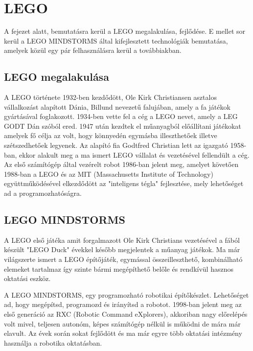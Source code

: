 \chapter{LEGO} \label{ch:ROBOT}

\begin{osszefoglal}
	A fejezet alatt, bemutatásra kerül a LEGO megalakulása, fejlődése. E mellet sor kerül a LEGO MINDSTORMS által kifejlesztett technológiák bemutatása, amelyek közül egy pár felhasználásra kerül a továbbiakban.
\end{osszefoglal}

\section{LEGO megalakulása}\label{sec:ROBOT:lego}
A LEGO története 1932-ben kezdődött,  Ole Kirk Christiansen asztalos vállalkozást alapított Dánia, Billund nevezetű falujában, amely a fa játékok gyártásával foglakozott. 1934-ben vette fel a cég a LEGO nevet, amely a LEG GODT Dán szóból ered. 1947 után kezdtek el műanyagból előállítani játékokat amelyek fő célja az volt, hogy könnyedén egymásba illeszthetőek illetve szétszedhetőek legyenek. Az alapító fia Godtfred Christian lett az igazgató 1958-ban, ekkor alakult meg a ma ismert LEGO vállalat és vezetésével fellendült a cég. Az első számítógép által vezérelt robot 1986-ban jelent meg, amelyet követően 1988-ban a LEGO és az MIT (Massachusetts Institute of Technology) együttműködésével elkezdődött az "inteligens tégla" fejlesztése, mely lehetőséget ad a programozhatóságra.

\section{LEGO MINDSTORMS}\label{sec:ROBOT:mindstorms}
A LEGO első játéka amit forgalmazott Ole Kirk Christians vezetésével a fából készült "LEGO Duck" évekkel később megjelentek a műanyag játékok. Ma már világszerte ismert a LEGO építőjáték, egymással összeilleszthető, kombinálható elemeket tartalmaz így szinte bármi megépíthető belőle és rendkívül hasznos oktatási eszköz. 

A LEGO MINDSTORMS, egy programozható robotikai építőkészlet. Lehetőséget ad, hogy megépítsd, programozd és irányítsd a robotot.
1998-ban jelent meg az első generáció az RXC  (Robotic Command eXplorers), akkoriban nagy előrelépés volt mivel, teljesen autonóm, képes számítógép nélkül is működni de mára már elavult. Az évek során sokat fejlődött és ma már egyre több oktatási intézmény használja a robotika oktatásban.

